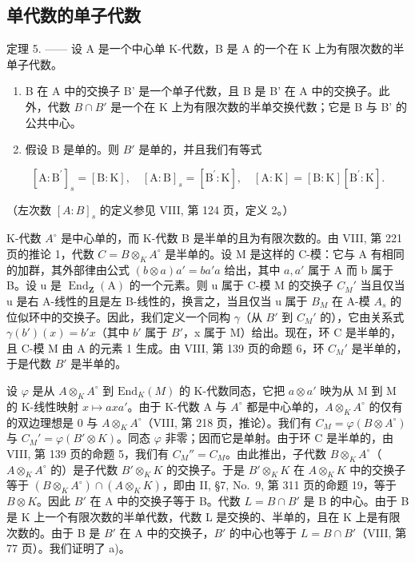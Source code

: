 \subsection{单代数的单子代数}

定理 5. —— 设 A 是一个中心单 K-代数，B 是 A 的一个在 K 上为有限次数的半单子代数。

\begin{enumerate}
\def\labelenumi{\alph{enumi})}
\item
  B 在 A 中的交换子 B' 是一个单子代数，且 B 是 B' 在 A 中的交换子。此外，代数 \(B \cap B'\) 是一个在 K 上为有限次数的半单交换代数；它是 B 与 B' 的公共中心。
\item
  假设 B 是单的。则 \(B'\) 是单的，并且我们有等式
\end{enumerate}

\[
[ \mathrm{A}: \mathrm{B} ^ {\prime} ] _ {s} = [ \mathrm{B}: \mathrm{K} ], \quad [ \mathrm{A}: \mathrm{B} ] _ {s} = [ \mathrm{B} ^ {\prime}: \mathrm{K} ], \quad [ \mathrm{A}: \mathrm{K} ] = [ \mathrm{B}: \mathrm{K} ] [ \mathrm{B} ^ {\prime}: \mathrm{K} ].
\]

（左次数 \([A : B]_s\) 的定义参见 VIII, 第 124 页，定义 2。）

K-代数 \(A^{\circ}\) 是中心单的，而 K-代数 B 是半单的且为有限次数的。由 VIII, 第 221 页的推论 1，代数 \(C = B \otimes_{K} A^{\circ}\) 是半单的。设 M 是这样的 C-模：它与 A 有相同的加群，其外部律由公式 \((b \otimes a)a' = ba'a\) 给出，其中 \(a, a'\) 属于 A 而 b 属于 B。设 u 是 \(\operatorname{End}_{\mathbf{Z}}(\mathrm{A})\) 的一个元素。则 u 属于 C-模 M 的交换子 \(C_{M}'\) 当且仅当 u 是右 A-线性的且是左 B-线性的，换言之，当且仅当 u 属于 \(B_{M}\) 在 A-模 \(A_{s}\) 的位似环中的交换子。因此，我们定义一个同构 \(\gamma\)（从 \(B'\) 到 \(C_{M}'\) 的），它由关系式 \(\gamma(b')(x) = b'x\)（其中 \(b'\) 属于 \(B'\)，x 属于 M）给出。现在，环 C 是半单的，且 C-模 M 由 A 的元素 1 生成。由 VIII, 第 139 页的命题 6，环 \(C_{M}'\) 是半单的，于是代数 \(B'\) 是半单的。

设 \(\varphi\) 是从 \(A \otimes_K A^\circ\) 到 \(\mathrm{End}_K(M)\) 的 K-代数同态，它把 \(a \otimes a'\) 映为从 M 到 M 的 K-线性映射 \(x \mapsto axa'\)。由于 K-代数 A 与 \(A^\circ\) 都是中心单的，\(A \otimes_K A^\circ\) 的仅有的双边理想是 0 与 \(A \otimes_K A^\circ\)（VIII, 第 218 页，推论）。我们有 \(C_M = \varphi(B \otimes A^\circ)\) 与 \(C_M' = \varphi(B' \otimes K)\)。同态 \(\varphi\) 非零；因而它是单射。由于环 C 是半单的，由 VIII, 第 139 页的命题 5，我们有 \(C_M'' = C_M\)。由此推出，子代数 \(B \otimes_K A^\circ\)（\(A \otimes_K A^\circ\) 的）是子代数 \(B' \otimes_K K\) 的交换子。于是 \(B' \otimes_K K\) 在 \(A \otimes_K K\) 中的交换子等于 \((B \otimes_K A^\circ) \cap (A \otimes_K K)\)，即由 II, §7, No.~9, 第 311 页的命题 19，等于 \(B \otimes K\)。因此 \(B'\) 在 A 中的交换子等于 B。代数 \(L = B \cap B'\) 是 B 的中心。由于 B 是 K 上一个有限次数的半单代数，代数 L 是交换的、半单的，且在 K 上是有限次数的。由于 B 是 \(B'\) 在 A 中的交换子，\(B'\) 的中心也等于 \(L = B \cap B'\)（VIII, 第 77 页）。我们证明了 a)。


